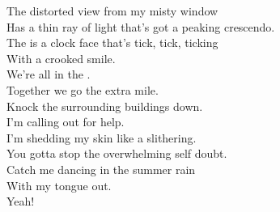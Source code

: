 
The distorted view from my misty window \\
Has a thin ray of light that's got a peaking crescendo. \\
The  is a clock face that's tick, tick, ticking \\
With a crooked smile. \\
We're all in the . \\
Together we go the extra mile. \\

Knock the surrounding buildings down. \\
I'm calling out for help. \\
I'm shedding my skin like a  slithering. \\
You gotta stop the overwhelming self doubt. \\
Catch me dancing in the summer rain \\
With my tongue out. \\
Yeah! \\
